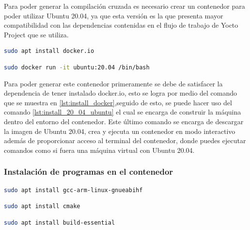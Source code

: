 Para poder generar la compilación cruzada es necesario crear un contenedor para poder utilizar Ubuntu 20.04, ya que esta versión es la que presenta mayor compatibilidad con las dependencias contenidas en el flujo de trabajo de Yocto Project que se utiliza. 


\begin{lstlisting}[language=bash, caption={Instalacion de docker, Linux}, label=lst:install_docker]
    sudo apt install docker.io
\end{lstlisting}

\begin{lstlisting}[language=bash, caption={Instalacion de Ubuntu 20.04, Linux}, label=lst:install_20_04_ubuntu]
    sudo docker run -it ubuntu:20.04 /bin/bash
\end{lstlisting}

Para poder generar este contenedor primeramente se debe de satisfacer la dependencia de tener instalado docker.io, esto se logra por medio del comando que se muestra en \ref{lst:install_docker},seguido de esto, se puede hacer uso del comando \ref{lst:install_20_04_ubuntu} el cual se encarga de construir la máquina dentro del entorno del contenedor. Este último comando se encarga de descargar la imagen de Ubuntu 20.04, crea y ejecuta un contenedor en modo interactivo además de proporcionar acceso al terminal del contenedor, donde puedes ejecutar comandos como si fuera una máquina virtual con Ubuntu 20.04.

\subsubsection{Instalación de programas en el contenedor}

\begin{lstlisting}[language=bash, caption={Instalacion del compilador cruzado, Linux}, label=lst:cross_compiler]
    sudo apt install gcc-arm-linux-gnueabihf
\end{lstlisting}

\begin{lstlisting}[language=bash, caption={Instalacion de CMake, Linux}, label=lst:cmake]
    sudo apt install cmake
\end{lstlisting}

\begin{lstlisting}[language=bash, caption={Instalacion de build essential, Linux}, label=lst:build_essential]
    sudo apt install build-essential
\end{lstlisting}

